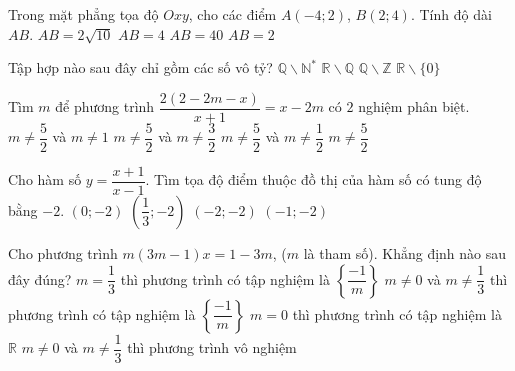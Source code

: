 \begin{ex}%
        Trong mặt phẳng tọa độ $Oxy$, cho các điểm $A(-4;2)$, $B(2;4)$. Tính độ dài $AB$.
        \choice        
        {\True $AB=2\sqrt{10}$}
        {$AB=4$}
        {$AB=40$}
        {$AB=2$}
\end{ex}
\begin{ex}%
        Tập hợp nào sau đây chỉ gồm các số vô tỷ?
        \choice        
        {$\mathbb{Q}\backslash \mathbb{N^*}$}
        {\True $\mathbb{R\backslash \mathbb{Q}}$}
        {$\mathbb{Q}\backslash \mathbb{Z}$ }
        {$\mathbb{R}\backslash \{0\}$}
\end{ex}
\begin{ex}%
        Tìm $m$ để phương trình $\dfrac{2(2-2m-x)}{x+1}=x-2m$ có $2$ nghiệm phân biệt.
        \choice        
        {$m\neq \dfrac{5}{2}$ và $m\neq 1$}
        {\True $m\neq \dfrac{5}{2}$ và $m\neq \dfrac{3}{2}$}
        {$m\neq \dfrac{5}{2}$ và $m\neq \dfrac{1}{2}$}
        {$m\neq \dfrac{5}{2}$}
\end{ex}
\begin{ex}%
        Cho hàm số $y=\dfrac{x+1}{x-1}$. Tìm tọa độ điểm thuộc đồ thị của hàm số có tung độ bằng $-2$.
        \choice        
        {$(0;-2)$}
        {\True $\left(\dfrac{1}{3};-2\right)$}
        {$(-2;-2)$}
        {$(-1;-2)$}
\end{ex}
\begin{ex}%
        Cho phương trình $m(3m-1)x=1-3m$, ($m$  là tham số). Khẳng định nào sau đây đúng?
        \choice        
        {$m=\dfrac{1}{3}$ thì phương trình có tập nghiệm là $\left\{\dfrac{-1}{m}\right\}$}
        {\True $m\neq 0$ và $m\neq \dfrac{1}{3}$ thì phương trình có tập nghiệm là $\left\{\dfrac{-1}{m}\right\}$}
        {$m=0$ thì phương trình có tập nghiệm là $\mathbb{R}$}
        {$m\neq 0$ và $m\neq \dfrac{1}{3}$ thì phương trình vô nghiệm}
\end{ex}
